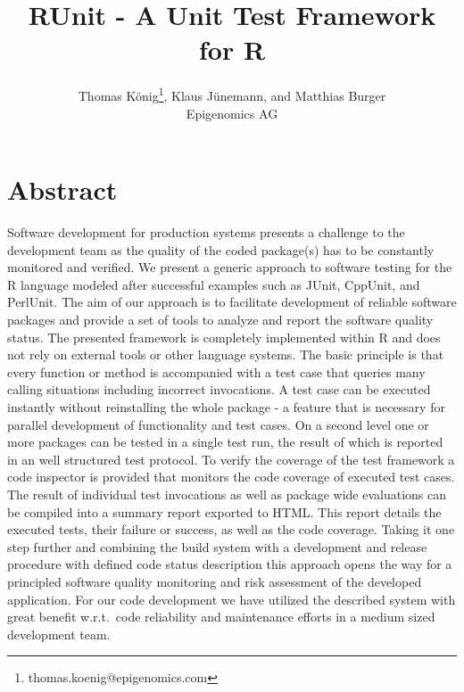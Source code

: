 \documentclass[12pt, a4paper]{article}
\begin{document}
\title{RUnit - A Unit Test Framework for R}
\author{Thomas K\"onig\footnote{thomas.koenig@epigenomics.com}, Klaus J\"unemann, and Matthias Burger\\Epigenomics AG}
\maketitle
\tableofcontents
\section*{Abstract}
\label{section:abstract}
Software development for production systems presents a challenge to the development team as the quality of the coded package(s) has to be constantly monitored and verified. We present a generic approach to software testing for the R language modeled after successful examples such as JUnit, CppUnit, and PerlUnit. The aim of our approach is to facilitate development of reliable software packages and provide a set of tools to analyze and report the software quality status. The presented framework is completely implemented within R and does not rely on external tools or other language systems. The basic principle is that every function or method is accompanied with a test case that queries many calling situations including incorrect invocations. A test case can be executed instantly without reinstalling the whole package - a feature that is necessary for parallel development of functionality and test cases. On a second level one or more packages can be tested in a single test run, the result of which is reported in an well structured test protocol.
To verify the coverage of the test framework a code inspector is provided that monitors the code coverage of executed test cases. The result of individual test invocations as well as package wide evaluations can be compiled into a summary report exported to HTML. This report details the executed tests, their failure or success, as well as the code coverage. Taking it one step further and combining the build system with a development and release procedure with defined code status description this approach opens the way for a principled software quality monitoring and risk assessment of the developed application.
For our code development we have utilized the described system with great benefit w.r.t.\ code reliability and maintenance efforts in a medium sized development team.
\end{document}
